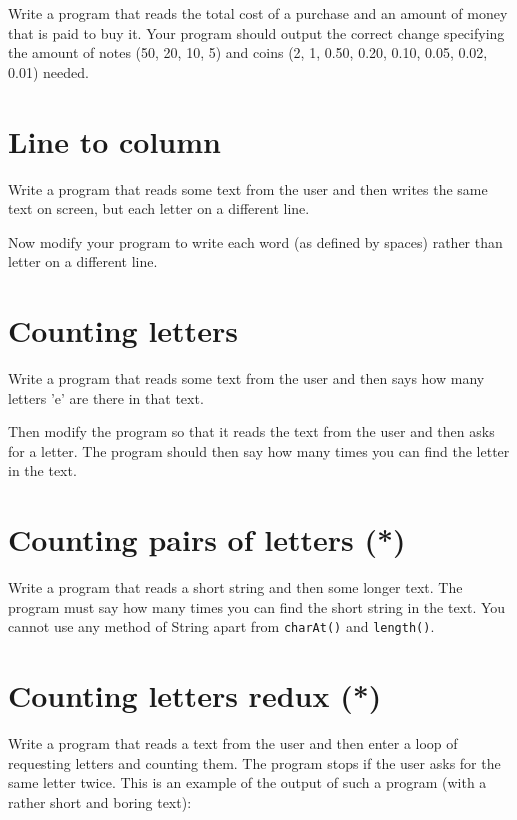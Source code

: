 \documentclass{article}
\begin{document}
Write a program that reads the total cost of a purchase and an amount
of money that is paid to buy it. Your program should output the
correct change specifying the amount of notes (50, 20, 10, 5) and
coins (2, 1, 0.50, 0.20, 0.10, 0.05, 0.02, 0.01) needed. 

\section{Line to column}
\label{sec:line-column}

Write a program that reads some text from the user and then writes the
same text on screen, but each letter on a different line. 

Now modify your program to write each word (as defined by spaces)
rather than letter on a different line. 

\section{Counting letters}
\label{sec:counting-letters}

Write a program that reads some text from the user and then says how
many letters 'e' are there in that text. 

Then modify the program so that it reads the text from the user and
then asks for a letter. The program should then say how many times you
can find the letter in the text. 

\section{Counting pairs of letters (*)}
\label{sec:count-pairs-lett}

Write a program that reads a short string and then some longer
text. The program must say how many times you can find the short string in the
text. You cannot use any method of String apart from \verb+charAt()+
and \verb+length()+. 

\section{Counting letters redux (*)}
\label{sec:count-lett-redux}

Write a program that reads a text from the user and then enter a loop
of requesting letters and counting them. The program stops if the user
asks for the same letter twice. This is an example of the output of
such a program (with a rather short and boring text): 
\end{document}
